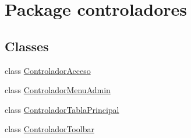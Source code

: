 \hypertarget{namespacecontroladores}{}\section{Package controladores}
\label{namespacecontroladores}
\subsection*{Classes}
\begin{DoxyCompactItemize}
\item 
class \mbox{\hyperlink{classcontroladores_1_1_controlador_acceso}{Controlador\+Acceso}}
\item 
class \mbox{\hyperlink{classcontroladores_1_1_controlador_menu_admin}{Controlador\+Menu\+Admin}}
\item 
class \mbox{\hyperlink{classcontroladores_1_1_controlador_tabla_principal}{Controlador\+Tabla\+Principal}}
\item 
class \mbox{\hyperlink{classcontroladores_1_1_controlador_toolbar}{Controlador\+Toolbar}}
\end{DoxyCompactItemize}
